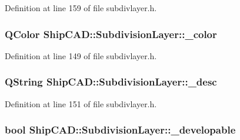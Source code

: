 Definition at line 159 of file subdivlayer.\-h.

\hypertarget{classShipCAD_1_1SubdivisionLayer_a6da22248952737662360fa3b2730a35f}{
\subsubsection[{\-\_\-color}]{\setlength{\rightskip}{0pt plus 5cm}Q\-Color Ship\-C\-A\-D\-::\-Subdivision\-Layer\-::\-\_\-color\hspace{0.3cm}{\ttfamily [protected]}}}\label{classShipCAD_1_1SubdivisionLayer_a6da22248952737662360fa3b2730a35f}


Definition at line 149 of file subdivlayer.\-h.

\hypertarget{classShipCAD_1_1SubdivisionLayer_a33bbfedf8f0d130d91c74a65a575eb2a}{
\subsubsection[{\-\_\-desc}]{\setlength{\rightskip}{0pt plus 5cm}Q\-String Ship\-C\-A\-D\-::\-Subdivision\-Layer\-::\-\_\-desc\hspace{0.3cm}{\ttfamily [protected]}}}\label{classShipCAD_1_1SubdivisionLayer_a33bbfedf8f0d130d91c74a65a575eb2a}


Definition at line 151 of file subdivlayer.\-h.

\hypertarget{classShipCAD_1_1SubdivisionLayer_a81dad738f58f9b4632c1575d0b59ddb0}{
\subsubsection[{\-\_\-developable}]{\setlength{\rightskip}{0pt plus 5cm}bool Ship\-C\-A\-D\-::\-Subdivision\-Layer\-::\-\_\-developable\hspace{0.3cm}{\ttfamily [protected]}}}\label{classShipCAD_1_1SubdivisionLayer_a81dad738f58f9b4632c1575d0b59ddb0}


